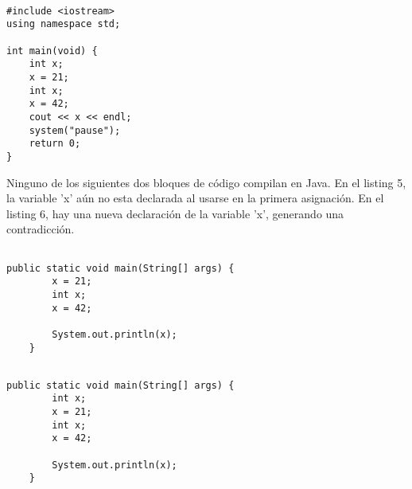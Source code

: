 \begin{lstlisting}[caption= Pregunta 5 Capítulo 5, label=amb, frame=single]  % Start your code-block
  
#include <iostream>
using namespace std;

int main(void) {
	int x;
	x = 21;
	int x;
	x = 42;
	cout << x << endl;
	system("pause");
	return 0;
}
\end{lstlisting}

Ninguno de los siguientes dos bloques de código compilan en Java. En el listing 5, la variable 'x' aún no esta declarada al usarse en la primera asignación.
En el listing 6, hay una nueva declaración de la variable 'x', generando una contradicción.

\lstset{language=Java}          %

\begin{lstlisting}[caption= Pregunta 5 Capítulo 5, label=amb, frame=single]  % Start your code-block
  
public static void main(String[] args) {
        x = 21;
        int x;
        x = 42;
        
        System.out.println(x);
    }
\end{lstlisting}

\begin{lstlisting}[caption= Pregunta 5 Capítulo 5, label=amb, frame=single]  % Start your code-block
  
public static void main(String[] args) {
        int x;
        x = 21;
        int x;
        x = 42;
        
        System.out.println(x);
    }
\end{lstlisting}